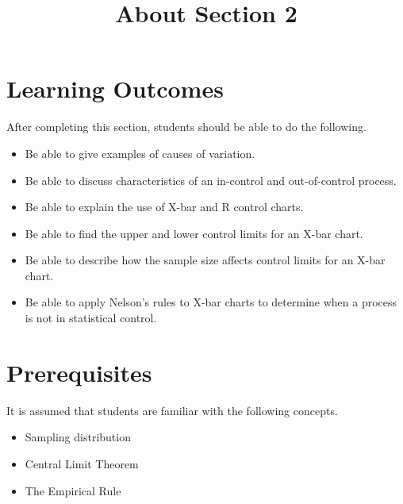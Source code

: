 \documentclass{ximera}
\title{About Section 2}
\begin{document}
\begin{abstract}
\end{abstract}
 
\maketitle
 
\section*{Learning Outcomes}
After completing this section, students should be able to do the following.
 
\begin{itemize}
\item Be  able to give examples of causes of variation.
\item Be able to discuss characteristics of an in-control and out-of-control process.
    \item Be able to explain the use of X-bar and R control charts.
    \item Be able to find the upper and lower control limits for an X-bar chart.
    \item Be able to describe how the sample size affects control limits for an X-bar chart.
    \item Be able to apply Nelson's rules to X-bar charts to determine when a process is not in statistical control.
    
   \end{itemize}

   \section*{Prerequisites}
   It is assumed that students are familiar with the following concepts.
   \begin{itemize}
   \item Sampling distribution
       \item Central Limit Theorem
        \item The Empirical Rule
   \end{itemize}
 
\end{document}
